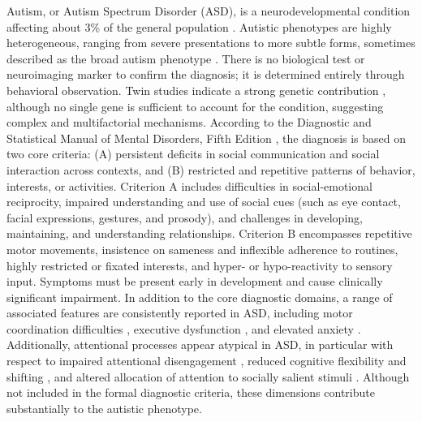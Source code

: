 \documentclass{article}
\begin{document}
Autism, or Autism Spectrum Disorder (ASD), is a neurodevelopmental condition affecting about 3\% of the general population \citep{Shaw2025}. Autistic phenotypes are highly heterogeneous, ranging from severe presentations to more subtle forms, sometimes described as the broad autism phenotype \citep{Wheelwright2010}. There is no biological test or neuroimaging marker to confirm the diagnosis; it is determined entirely through behavioral observation. Twin studies indicate a strong genetic contribution \citep{Tick2016}, although no single gene is sufficient to account for the condition, suggesting complex and multifactorial mechanisms. According to the Diagnostic and Statistical Manual of Mental Disorders, Fifth Edition \citep{Harm2013}, the diagnosis is based on two core criteria: (A) persistent deficits in social communication and social interaction across contexts, and (B) restricted and repetitive patterns of behavior, interests, or activities. Criterion A includes difficulties in social-emotional reciprocity, impaired understanding and use of social cues (such as eye contact, facial expressions, gestures, and prosody), and challenges in developing, maintaining, and understanding relationships. Criterion B encompasses repetitive motor movements, insistence on sameness and inflexible adherence to routines, highly restricted or fixated interests, and hyper- or hypo-reactivity to sensory input. Symptoms must be present early in development and cause clinically significant impairment. In addition to the core diagnostic domains, a range of associated features are consistently reported in ASD, including motor coordination difficulties \citep{Fournier2010}, executive dysfunction \citep{Hill2004}, and elevated anxiety \citep{Van2011}. Additionally, attentional processes appear atypical in ASD, in particular with respect to impaired attentional disengagement \citep{Landry2004}, reduced cognitive flexibility and shifting \citep{Hill2004}, and altered allocation of attention to socially salient stimuli \citep{Sasson2014}. Although not included in the formal diagnostic criteria, these dimensions contribute substantially to the autistic phenotype.
\end{document}
